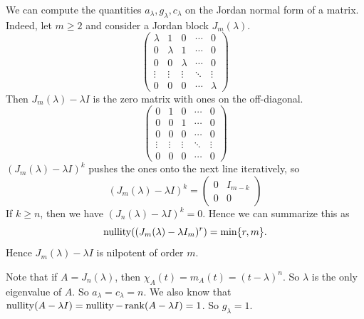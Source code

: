 \documentclass[a4paper,11pt]{article}
\begin{document}
We can compute the quantities \( a_\lambda, g_\lambda, c_\lambda \) on the Jordan normal form of a matrix.
Indeed, let \( m \geq 2 \) and consider a Jordan block \( J_m(\lambda) \).
\[
	\begin{pmatrix}
		\lambda & 1       & 0       & \cdots & 0       \\
		0       & \lambda & 1       & \cdots & 0       \\
		0       & 0       & \lambda & \cdots & 0       \\
		\vdots  & \vdots  & \vdots  & \ddots & \vdots  \\
		0       & 0       & 0       & \cdots & \lambda
	\end{pmatrix}
\]
Then \( J_m(\lambda) - \lambda I \) is the zero matrix with ones on the off-diagonal.
\[
	\begin{pmatrix}
		0 & 1       & 0       & \cdots & 0       \\
		0       & 0 & 1       & \cdots & 0       \\
		0       & 0       & 0 & \cdots & 0       \\
		\vdots  & \vdots  & \vdots  & \ddots & \vdots  \\
		0       & 0       & 0       & \cdots & 0
	\end{pmatrix}
\]
\( (J_m(\lambda) - \lambda I)^k \) pushes the ones onto the next line iteratively, so
\[
	(J_m(\lambda) - \lambda I)^k = \begin{pmatrix}
		0 & I_{m-k} \\
		0 & 0
	\end{pmatrix}
\]
If $k \geq n$, then we have $(J_n(\lambda) - \lambda I)^k = 0$.
Hence we can summarize this as
\[
\operatorname{nullity}((J_m(\lambda) - \lambda I_m)^r) = \min\{r, m\}.
\]
Hence \( J_m(\lambda) - \lambda I \) is nilpotent of order \( m \).

Note that if $A = J_n(\lambda)$, then $\chi_A(t) = m_A(t) = (t - \lambda)^n$. So $\lambda$ is the only eigenvalue of $A$. So $a_\lambda = c_\lambda = n$. We also know that $\operatorname{nullity}(A - \lambda I) = \operatorname{nullity} - \rank(A - \lambda I) = 1$. So $g_\lambda = 1$.
\end{document}
